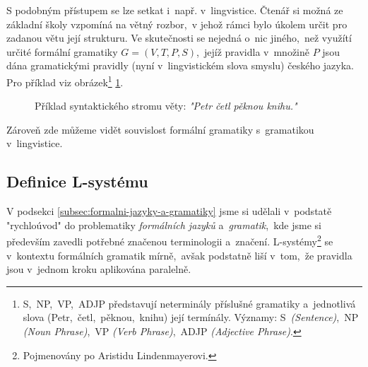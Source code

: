 S podobným přístupem se lze setkat i~např. v~lingvistice. Čtenář si možná ze základní školy vzpomíná na větný rozbor,~v jehož rámci bylo úkolem určit pro zadanou větu její strukturu. Ve skutečnosti se nejedná o~nic jiného,~než využítí určité formální gramatiky $G=(V,T,P,S)$,~jejíž pravidla v~množině $P$ jsou dána gramatickými pravidly (nyní v~lingvistickém slova smyslu) českého jazyka. Pro příklad viz obrázek\footnote{S,~NP,~VP,~ADJP představují neterminály příslušné gramatiky a~jednotlivá slova (Petr,~četl,~pěknou,~knihu) její termínály. Významy: S~\emph{(Sentence)},~NP \emph{(Noun Phrase)},~VP \emph{(Verb Phrase)},~ADJP \emph{(Adjective Phrase)}.} \ref{fig:syntax-strom-vety}.
\begin{figure}[h]
    \centering
    \caption{Příklad syntaktického stromu věty: \emph{"Petr četl pěknou knihu."}}
    \label{fig:syntax-strom-vety}
\end{figure}
Zároveň zde můžeme vidět souvislost formální gramatiky s~gramatikou v~lingvistice.

\subsection{Definice L-systému}\label{subsec:definice-lsystemu}

V podsekci \ref{subsec:formalni-jazyky-a-gramatiky} jsme si udělali v~podstatě "rychloúvod" do problematiky \emph{formálních jazyků} a~\emph{gramatik},~kde jsme si především zavedli potřebné značenou terminologii a~značení. L-systémy\footnote{Pojmenovány po Aristidu Lindenmayerovi.} se v~kontextu formálních gramatik mírně,~avšak podstatně liší v~tom,~že pravidla jsou v~jednom kroku aplikována paralelně.

